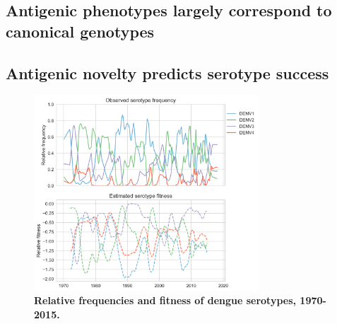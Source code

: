\documentclass[11pt,oneside,letterpaper]{article}
\begin{document}


\subsection{Antigenic phenotypes largely correspond to canonical genotypes}


\subsection{Antigenic novelty predicts serotype success}

\begin{figure}[h]
\centering
\includegraphics[width=0.75\textwidth]{../figures/png/serotype_fitness.png}
    \caption{\textbf{Relative frequencies and fitness of dengue serotypes, 1970-2015.}}
     \label{serotype_fitness}
\end{figure}
\end{document}
